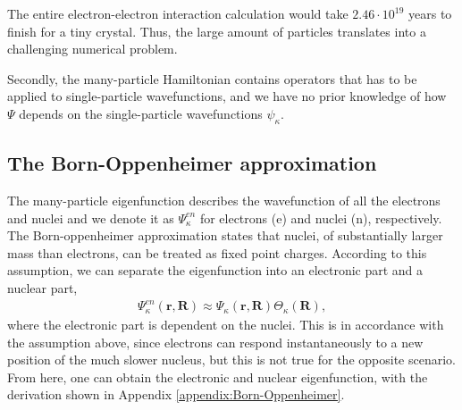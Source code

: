 The entire electron-electron interaction calculation would take $2.46 \cdot 10^{19}$ years to finish for a tiny crystal. Thus, the large amount of particles translates into a challenging numerical problem.


Secondly, the many-particle Hamiltonian contains operators that has to be applied to single-particle wavefunctions, and we have no prior knowledge of how $\Psi$ depends on the single-particle wavefunctions $\psi_\kappa$.


\subsection{The Born-Oppenheimer approximation}
The many-particle eigenfunction describes the wavefunction of all the electrons and nuclei and we denote it as $\Psi_{\kappa}^{en}$ for electrons (e) and nuclei (n), respectively. The Born-oppenheimer approximation states that nuclei, of substantially larger mass than electrons, can be treated as fixed point charges. According to this assumption, we can separate the eigenfunction into an electronic part and a nuclear part,
\begin{align}
  \Psi_\kappa^{en}(\boldsymbol{r}, \boldsymbol{R}) \approx \Psi_{\kappa}(\boldsymbol{r}, \boldsymbol{R})\Theta_{\kappa}(\boldsymbol{R}),
\end{align}
where the electronic part is dependent on the nuclei. This is in accordance with the assumption above, since electrons can respond instantaneously to a new position of the much slower nucleus, but this is not true for the opposite scenario. From here, one can obtain the electronic and nuclear eigenfunction, with the derivation shown in Appendix \ref{appendix:Born-Oppenheimer}.


